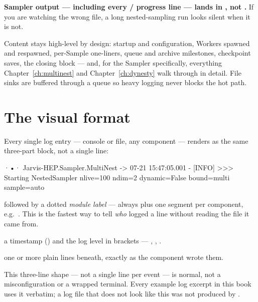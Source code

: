 \begin{jwarn}
\textbf{Sampler output --- including every /
progress line --- lands in , not .} If you are
watching the wrong file, a long nested-sampling run looks silent when it is not.
\end{jwarn}

Content stays high-level by design: startup and configuration, Workers spawned and
respawned, per-Sample one-liners, queue and archive milestones, checkpoint saves, the
closing  block --- and, for the Sampler specifically,
everything Chapter~\ref{ch:multinest} and Chapter~\ref{ch:dynesty} walk through in
detail. File sinks are buffered through a queue so heavy logging never blocks the hot
path.

\section{The visual format}
\label{sec:log-visual-format}

Every single log entry --- console or file, any component --- renders as the same
three-part block, not a single line:

\begin{terminal}
\begin{jout}
·•· Jarvis-HEP.Sampler.MultiNest
	-> 07-21 15:47:05.001 - [INFO] >>>
Starting NestedSampler nlive=100 ndim=2 dynamic=False bound=multi sample=auto
\end{jout}
\end{terminal}

\begin{keylist}
  \item[the bullet line]  followed by a dotted \emph{module label} ---
        always  plus one segment per component, e.g.\
        . This is the fastest way to tell \emph{who} logged
        a line without reading the file it came from.
  \item[the arrow line] a timestamp () and the log level in
        brackets --- \code{[INFO]}, \code{[WARNING]}, \code{[ERROR]}.
  \item[the message] one or more plain lines beneath, exactly as the component wrote
        them.
\end{keylist}

\begin{jnote}
This three-line shape --- not a single line per event --- is normal, not a
misconfiguration or a wrapped terminal. Every example log excerpt in this book uses
it verbatim; a log file that does not look like this was not produced by \Jtwo.
\end{jnote}

